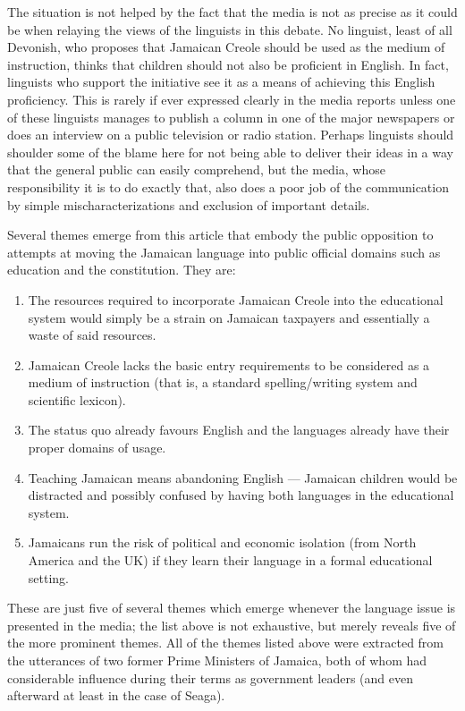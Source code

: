 \documentclass[output=paper,colorlinks,citecolor=brown]{langscibook}
\begin{document}
The situation is not helped by the fact that the media is not as precise as it could be when relaying the views of the linguists in this debate. No linguist, least of all Devonish, who proposes that Jamaican Creole should be used as the medium of instruction, thinks that children should not also be proficient in English. In fact, linguists who support the initiative see it as a means of achieving this English proficiency. This is rarely if ever expressed clearly in the media reports unless one of these linguists manages to publish a column in one of the major newspapers or does an interview on a public television or radio station. Perhaps linguists should shoulder some of the blame here for not being able to deliver their ideas in a way that the general public can easily comprehend, but the media, whose responsibility it is to do exactly that, also does a poor job of the communication by simple mischaracterizations and exclusion of important details. 

Several themes emerge from this article that embody the public opposition to attempts at moving the Jamaican language into public official domains such as education and the constitution. They are: 

\begin{enumerate}
    \item The resources required to incorporate Jamaican Creole into the educational system would simply be a strain on Jamaican taxpayers and essentially a waste of said resources. 

    \item Jamaican Creole lacks the basic entry requirements to be considered as a medium of instruction (that is, a standard spelling/writing system and scientific lexicon). 

    \item The status quo already favours English and the languages already have their proper domains of usage.  

    \item Teaching Jamaican means abandoning English — Jamaican children would be distracted and possibly confused by having both languages in the educational system.
    
    \item Jamaicans run the risk of political and economic isolation (from North America and the UK) if they learn their language in a formal educational setting.
\end{enumerate}	 

These are just five of several themes which emerge whenever the language issue is presented in the media; the list above is not exhaustive, but merely reveals five of the more prominent themes. All of the themes listed above were extracted from the utterances of two former Prime Ministers of Jamaica, both of whom had considerable influence during their terms as government leaders (and even afterward at least in the case of Seaga).  
\end{document}
